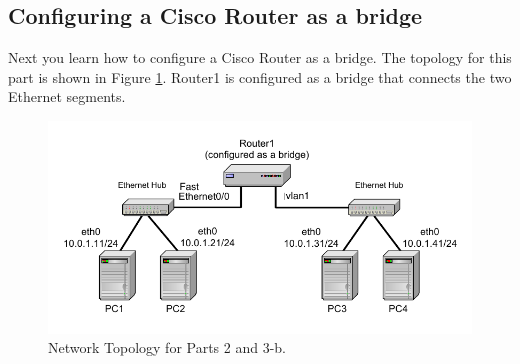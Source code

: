 \newpage
\subsection{Configuring a Cisco Router as a bridge}

Next you learn how to configure a Cisco Router as a bridge. The topology for this part is shown in Figure \ref{fig:lab6-network2}. Router1 is configured as a bridge that connects the two Ethernet segments.

\begin{figure}[h!t]
	\centering
	\includegraphics[width=\linewidth]{graphics/lab6-network2-updated.pdf}
	\caption{Network Topology for Parts 2 and 3-b.}
	\label{fig:lab6-network2}
\end{figure}

